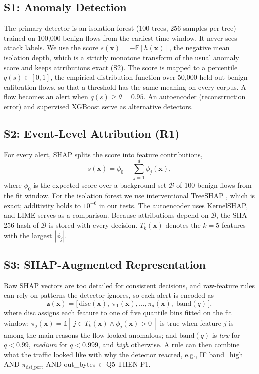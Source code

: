 \documentclass[journal]{IEEEtran}
\begin{document}
\subsection{S1: Anomaly Detection}
The primary detector is an isolation forest \cite{iforest} (100 trees, 256 samples per tree) trained on 100{,}000 benign flows from the earliest time window. It never sees attack labels. We use the score $s(\mathbf{x})=-\mathbb{E}[h(\mathbf{x})]$, the negative mean isolation depth, which is a strictly monotone transform of the usual anomaly score and keeps attributions exact (S2). The score is mapped to a percentile $q(s)\in[0,1]$, the empirical distribution function over 50{,}000 held-out benign calibration flows, so that a threshold has the same meaning on every corpus. A flow becomes an alert when $q(s)\geq\theta=0.95$. An autoencoder (reconstruction error) and supervised XGBoost \cite{xgboost} serve as alternative detectors.

\subsection{S2: Event-Level Attribution (R1)}
For every alert, SHAP splits the score into feature contributions,
\begin{equation}
s(\mathbf{x})=\phi_0+\textstyle\sum_{j=1}^{d}\phi_j(\mathbf{x}),
\end{equation}
where $\phi_0$ is the expected score over a background set $\mathcal{B}$ of 100 benign flows from the fit window. For the isolation forest we use interventional TreeSHAP \cite{treeshap}, which is exact; additivity holds to $10^{-6}$ in our tests. The autoencoder uses KernelSHAP, and LIME \cite{lime} serves as a comparison. Because attributions depend on $\mathcal{B}$, the SHA-256 hash of $\mathcal{B}$ is stored with every decision. $T_k(\mathbf{x})$ denotes the $k=5$ features with the largest $|\phi_j|$.

\subsection{S3: SHAP-Augmented Representation}
Raw SHAP vectors are too detailed for consistent decisions, and raw-feature rules can rely on patterns the detector ignores, so each alert is encoded as
\begin{equation}
\mathbf{z}(\mathbf{x})=\big[\,\mathrm{disc}(\mathbf{x}),\;\pi_1(\mathbf{x}),\dots,\pi_d(\mathbf{x}),\;\mathrm{band}(q)\,\big],
\end{equation}
where $\mathrm{disc}$ assigns each feature to one of five quantile bins fitted on the fit window; $\pi_j(\mathbf{x})=\mathbb{1}[\,j\in T_k(\mathbf{x})\wedge\phi_j(\mathbf{x})>0\,]$ is true when feature $j$ is among the main reasons the flow looked anomalous; and $\mathrm{band}(q)$ is \emph{low} for $q<0.99$, \emph{medium} for $q<0.999$, and \emph{high} otherwise. A rule can then combine what the traffic looked like with why the detector reacted, e.g., \textsf{IF band=high AND $\pi_{\text{dst\_port}}$ AND out\_bytes$\,\in\,$Q5 THEN P1}.
\end{document}

